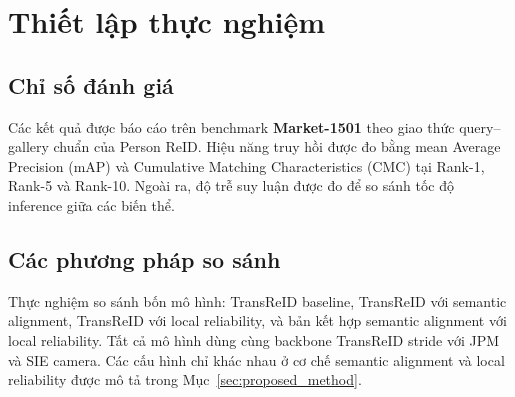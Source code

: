 \section{Thiết lập thực nghiệm}
\label{sec:experimental_setup}

\subsection{Chỉ số đánh giá}

Các kết quả được báo cáo trên benchmark \textbf{Market-1501}
\cite{zheng2015market1501} theo giao thức query--gallery chuẩn của Person
ReID. Hiệu năng truy hồi được đo bằng mean Average Precision (mAP) và Cumulative
Matching Characteristics (CMC) tại Rank-1, Rank-5 và Rank-10. Ngoài ra, độ trễ
suy luận được đo để so sánh tốc độ inference giữa các biến thể.

\subsection{Các phương pháp so sánh}

Thực nghiệm so sánh bốn mô hình: TransReID baseline, TransReID với semantic
alignment, TransReID với local reliability, và bản kết hợp semantic alignment
với local reliability. Tất cả mô hình dùng cùng backbone TransReID stride với
JPM và SIE camera. Các cấu hình chỉ khác nhau ở cơ chế semantic alignment và
local reliability được mô tả trong Mục~\ref{sec:proposed_method}.
